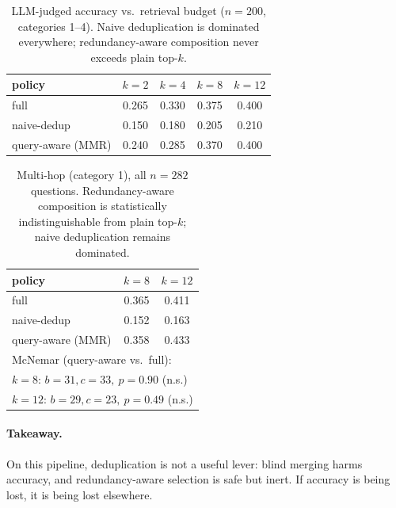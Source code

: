 \begin{table}[t]
\centering
\small
\begin{tabular}{lcccc}
\toprule
policy & $k{=}2$ & $k{=}4$ & $k{=}8$ & $k{=}12$ \\
\midrule
full & 0.265 & 0.330 & 0.375 & 0.400 \\
naive-dedup & 0.150 & 0.180 & 0.205 & 0.210 \\
query-aware (MMR) & 0.240 & 0.285 & 0.370 & 0.400 \\
\bottomrule
\end{tabular}
\caption{LLM-judged accuracy vs.\ retrieval budget ($n{=}200$, categories 1--4).
Naive deduplication is dominated everywhere; redundancy-aware composition never
exceeds plain top-$k$.}
\label{tab:sweep}
\end{table}

\begin{table}[t]
\centering
\small
\begin{tabular}{lcc}
\toprule
policy & $k{=}8$ & $k{=}12$ \\
\midrule
full & 0.365 & 0.411 \\
naive-dedup & 0.152 & 0.163 \\
query-aware (MMR) & 0.358 & 0.433 \\
\midrule
\multicolumn{3}{l}{McNemar (query-aware vs.\ full):} \\
\multicolumn{3}{l}{\quad $k{=}8$: $b{=}31,c{=}33,\ p{=}0.90$ (n.s.)} \\
\multicolumn{3}{l}{\quad $k{=}12$: $b{=}29,c{=}23,\ p{=}0.49$ (n.s.)} \\
\bottomrule
\end{tabular}
\caption{Multi-hop (category 1), all $n{=}282$ questions. Redundancy-aware
composition is statistically indistinguishable from plain top-$k$; naive
deduplication remains dominated.}
\label{tab:multihop}
\end{table}

\paragraph{Takeaway.} On this pipeline, deduplication is not a useful lever:
blind merging harms accuracy, and redundancy-aware selection is safe but
inert. If accuracy is being lost, it is being lost elsewhere.
